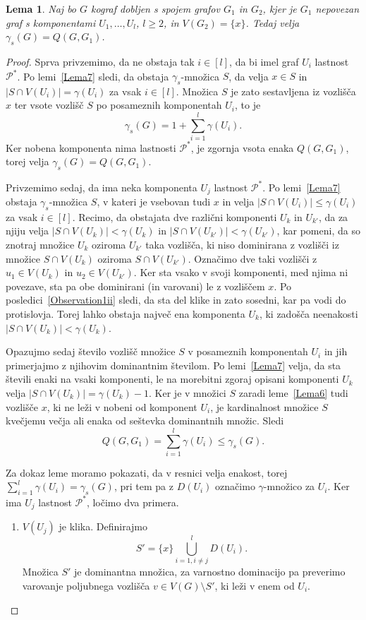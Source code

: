 \documentclass[12pt,a4paper,twoside]{article}
\theoremstyle{definition} %
\theoremstyle{plain} %
\newtheorem{lema}[definicija]{Lema}
\numberwithin{equation}{section}  %
\begin{document}
\begin{lema}\label{Lema8}
Naj bo $G$ kograf dobljen s spojem grafov $G_1$ in $G_2$, kjer je $G_1$ nepovezan graf s komponentami $U_1, \dots, U_l$, $l \geq 2$, in  $V(G_2) = \{x\}$. Tedaj velja $\gamma_s(G) = Q(G, G_1)$.
\end{lema}
\begin{proof}
Sprva privzemimo, da ne obstaja tak $i \in [l]$, da bi imel graf $U_i$ lastnost $\mathcal{P^*}$. Po lemi~\ref{Lema7} sledi, da obstaja $\gamma_s$-množica $S$, da velja $x\in S$ in $|S \cap V(U_i)| = \gamma(U_i)$ za vsak $i \in [l]$. Množica $S$ je zato sestavljena iz vozlišča $x$ ter vsote vozlišč $S$ po posameznih komponentah $U_i$, to je $$\gamma_s(G) = 1 + \sum\limits_{i=1}^l\gamma(U_i).$$ Ker nobena komponenta nima lastnosti $\mathcal{P^*}$, je zgornja vsota enaka $Q(G, G_1)$, torej velja $\gamma_s(G) = Q(G, G_1)$.

Privzemimo sedaj, da ima neka komponenta $U_j$ lastnost $\mathcal{P^*}$. Po lemi~\ref{Lema7} obstaja $\gamma_s$-množica $S$, v kateri je vsebovan tudi $x$ in velja $|S \cap V(U_i)| \leq \gamma(U_i)$ za vsak $i \in [l]$. Recimo, da obstajata dve različni komponenti $U_k$ in $U_{k'}$, da za njiju velja  $|S \cap V(U_k)| < \gamma(U_k)$ in $|S \cap V(U_{k'})| < \gamma(U_{k'})$, kar pomeni, da so znotraj množice $U_k$ oziroma $U_{k'}$ taka vozlišča, ki niso dominirana z vozlišči iz množice $S \cap V(U_k)$ oziroma $S \cap V(U_{k'})$. Označimo dve taki vozlišči z $u_1\in V(U_k)$ in $u_2 \in V(U_{k'})$. Ker sta vsako v svoji komponenti, med njima ni povezave, sta pa obe dominirani (in varovani) le z vozliščem $x$. Po posledici~\ref{Observation1ii} sledi, da sta del klike in zato sosedni, kar pa vodi do protislovja. Torej lahko obstaja največ ena komponenta $U_k$, ki zadošča neenakosti $|S \cap V(U_k)| < \gamma(U_k)$.

Opazujmo sedaj število vozlišč množice $S$ v posameznih komponentah $U_i$ in jih primerjajmo z njihovim dominantnim številom. Po lemi~\ref{Lema7} velja, da sta števili enaki na vsaki komponenti, le na morebitni zgoraj opisani komponenti $U_k$ velja $|S \cap V(U_k)| = \gamma(U_k) - 1$. Ker je v množici $S$ zaradi leme~\ref{Lema6} tudi vozlišče $x$, ki ne leži v nobeni od komponent $U_i$, je kardinalnost množice $S$ kvečjemu večja ali enaka od seštevka dominantnih množic. Sledi $$Q(G, G_1) = \sum\limits_{i = 1}^l\gamma(U_i) \leq \gamma_s(G).$$

Za dokaz leme moramo pokazati, da v resnici velja enakost, torej $\sum_{i = 1}^l\gamma(U_i) = \gamma_s(G)$, pri tem pa z $D(U_i)$ označimo $\gamma$-množico za $U_i$. Ker ima $U_j$ lastnost $\mathcal{P^*}$, ločimo dva primera.
\begin{enumerate}[label=($\roman*$)]
\item $V(U_j)$ je klika. Definirajmo $$S' = \{x\} \bigcup\limits_{i = 1, i \neq j}^l D(U_i).$$
Množica $S'$ je dominantna množica, za varnostno dominacijo pa preverimo varovanje poljubnega vozlišča $v \in V(G) \setminus S'$, ki leži v enem od $U_i$.


\end{enumerate}
\end{proof}
\end{document}
